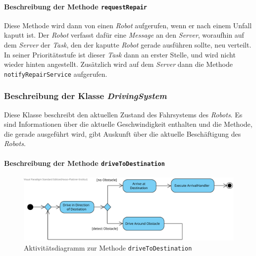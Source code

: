 			\paragraph{Beschreibung der Methode \texttt{requestRepair}}
			Diese Methode wird dann von einen \textit{Robot} aufgerufen, wenn er nach einem Unfall kaputt ist. Der \textit{Robot} verfasst dafür eine \textit{Message} an den \textit{Server}, woraufhin auf dem \textit{Server} der \textit{Task}, den der kaputte \textit{Robot} gerade ausführen sollte, neu verteilt. In seiner Prioritätsstufe ist dieser \textit{Task} dann an erster Stelle, und wird nicht wieder hinten angestellt. Zusätzlich wird auf dem \textit{Server} dann die Methode \texttt{notifyRepairService} aufgerufen.		
			
	\subsubsection{Beschreibung der Klasse \textit{DrivingSystem}}
		
		Diese Klasse beschreibt den aktuellen Zustand des Fahrsystems des \textit{Robots}. 
		Es sind Informationen über die aktuelle Geschwindigkeit enthalten und die Methode, 
		die gerade ausgeführt wird, gibt Auskunft über die aktuelle Beschäftigung des \textit{Robots}.

			\paragraph{Beschreibung der Methode \texttt{driveToDestination}}
			\begin{figure}[H]
			\centering
			\includegraphics[width=1\textwidth]{img/1-Entwurf-7-1-methode_driveAroundObstacle}
			\caption{Aktivitätsdiagramm zur Methode \texttt{driveToDestination}}
			\label{AktivitaetDriveToDestination}
			\end{figure}

